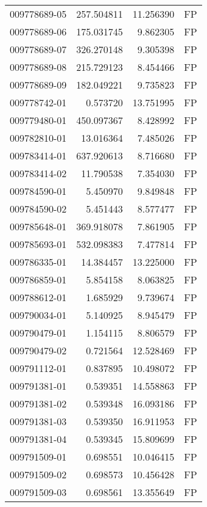 \begin{tabular}{lrrl}
009778689-05 &  257.504811 &      11.256390 &   FP \\
009778689-06 &  175.031745 &       9.862305 &   FP \\
009778689-07 &  326.270148 &       9.305398 &   FP \\
009778689-08 &  215.729123 &       8.454466 &   FP \\
009778689-09 &  182.049221 &       9.735823 &   FP \\
009778742-01 &    0.573720 &      13.751995 &   FP \\
009779480-01 &  450.097367 &       8.428992 &   FP \\
009782810-01 &   13.016364 &       7.485026 &   FP \\
009783414-01 &  637.920613 &       8.716680 &   FP \\
009783414-02 &   11.790538 &       7.354030 &   FP \\
009784590-01 &    5.450970 &       9.849848 &   FP \\
009784590-02 &    5.451443 &       8.577477 &   FP \\
009785648-01 &  369.918078 &       7.861905 &   FP \\
009785693-01 &  532.098383 &       7.477814 &   FP \\
009786335-01 &   14.384457 &      13.225000 &   FP \\
009786859-01 &    5.854158 &       8.063825 &   FP \\
009788612-01 &    1.685929 &       9.739674 &   FP \\
009790034-01 &    5.140925 &       8.945479 &   FP \\
009790479-01 &    1.154115 &       8.806579 &   FP \\
009790479-02 &    0.721564 &      12.528469 &   FP \\
009791112-01 &    0.837895 &      10.498072 &   FP \\
009791381-01 &    0.539351 &      14.558863 &   FP \\
009791381-02 &    0.539348 &      16.093186 &   FP \\
009791381-03 &    0.539350 &      16.911953 &   FP \\
009791381-04 &    0.539345 &      15.809699 &   FP \\
009791509-01 &    0.698551 &      10.046415 &   FP \\
009791509-02 &    0.698573 &      10.456428 &   FP \\
009791509-03 &    0.698561 &      13.355649 &   FP \\

\end{tabular}
